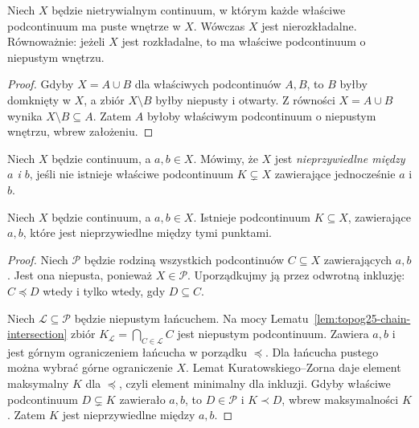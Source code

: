 \begin{stwierdzenie}
\label{prop:topog25-nowhere-dense}
Niech \(X\) będzie nietrywialnym continuum,
w którym każde właściwe podcontinuum
ma puste wnętrze w \(X\).
Wówczas \(X\) jest nierozkładalne.
Równoważnie: jeżeli \(X\) jest rozkładalne,
to ma właściwe podcontinuum
o niepustym wnętrzu.
\end{stwierdzenie}
\begin{proof}
Gdyby \(X=A\cup B\) dla właściwych
podcontinuów \(A,B\), to \(B\)
byłby domknięty w \(X\), a zbiór
\(X\setminus B\) byłby niepusty i otwarty.
Z równości \(X=A\cup B\)
wynika \(X\setminus B\subseteq A\).
Zatem \(A\) byłoby właściwym
podcontinuum o niepustym wnętrzu,
wbrew założeniu.
\end{proof}

\begin{definicja}
\label{def:topog25-irreducible}
Niech \(X\) będzie continuum,
a \(a,b\in X\).
Mówimy, że \(X\) jest
\emph{nieprzywiedlne między \(a\) i \(b\)},
jeśli nie istnieje właściwe
podcontinuum \(K\subsetneq X\)
zawierające jednocześnie \(a\) i \(b\).
\end{definicja}

\begin{twierdzenie}
\label{thm:topog25-irreducible-existence}
Niech \(X\) będzie continuum,
a \(a,b\in X\).
Istnieje podcontinuum
\(K\subseteq X\), zawierające \(a,b\),
które jest nieprzywiedlne między
tymi punktami.
\end{twierdzenie}
\begin{proof}
Niech \(\mathcal P\) będzie rodziną
wszystkich podcontinuów \(C\subseteq X\)
zawierających \(a,b\).
Jest ona niepusta, ponieważ \(X\in\mathcal P\).
Uporządkujmy ją przez odwrotną inkluzję:
\(C\preceq D\) wtedy i tylko wtedy,
gdy \(D\subseteq C\).

Niech \(\mathcal L\subseteq\mathcal P\)
będzie niepustym łańcuchem.
Na mocy
Lematu~\ref{lem:topog25-chain-intersection}
zbiór
\(K_{\mathcal L}=\bigcap_{C\in\mathcal L}C\)
jest niepustym podcontinuum.
Zawiera \(a,b\) i jest górnym
ograniczeniem łańcucha
w porządku \(\preceq\).
Dla łańcucha pustego można
wybrać górne ograniczenie \(X\).
Lemat Kuratowskiego--Zorna
daje element maksymalny \(K\)
dla \(\preceq\), czyli
element minimalny dla inkluzji.
Gdyby właściwe podcontinuum
\(D\subsetneq K\) zawierało \(a,b\),
to \(D\in\mathcal P\) i \(K\prec D\),
wbrew maksymalności \(K\).
Zatem \(K\) jest nieprzywiedlne
między \(a,b\).
\end{proof}

